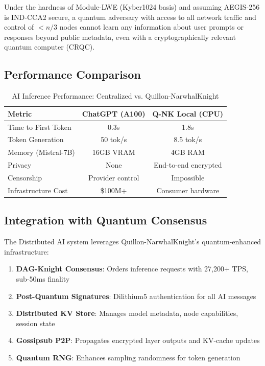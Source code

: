 \documentclass[11pt,a4paper]{article}
\begin{document}
\begin{theorem}
Under the hardness of Module-LWE (Kyber1024 basis) and assuming AEGIS-256 is IND-CCA2 secure, a quantum adversary with access to all network traffic and control of $<n/3$ nodes cannot learn any information about user prompts or responses beyond public metadata, even with a cryptographically relevant quantum computer (CRQC).
\end{theorem}

\subsection{Performance Comparison}

\begin{table}[H]
\centering
\caption{AI Inference Performance: Centralized vs. Quillon-NarwhalKnight}
\begin{tabular}{|l|c|c|}
\hline
\textbf{Metric} & \textbf{ChatGPT (A100)} & \textbf{Q-NK Local (CPU)} \\
\hline
Time to First Token & 0.3s & 1.8s \\
Token Generation & 50 tok/s & 8.5 tok/s \\
Memory (Mistral-7B) & 16GB VRAM & 4GB RAM \\
Privacy & None & End-to-end encrypted \\
Censorship & Provider control & Impossible \\
Infrastructure Cost & \$100M+ & Consumer hardware \\
\hline
\end{tabular}
\end{table}

\subsection{Integration with Quantum Consensus}

The Distributed AI system leverages Quillon-NarwhalKnight's quantum-enhanced infrastructure:

\begin{enumerate}
    \item \textbf{DAG-Knight Consensus}: Orders inference requests with 27,200+ TPS, sub-50ms finality
    \item \textbf{Post-Quantum Signatures}: Dilithium5 authentication for all AI messages
    \item \textbf{Distributed KV Store}: Manages model metadata, node capabilities, session state
    \item \textbf{Gossipsub P2P}: Propagates encrypted layer outputs and KV-cache updates
    \item \textbf{Quantum RNG}: Enhances sampling randomness for token generation
\end{enumerate}
\end{document}
